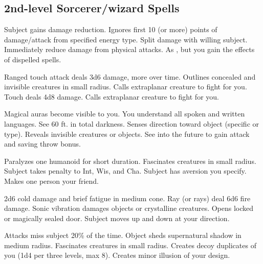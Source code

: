 \subsection{2nd-level Sorcerer/wizard Spells} 
\begin{swspelllist}
   Subject gains damage reduction.
   Ignores first 10 (or more) points of damage/attack from specified energy type.
   Split damage with willing subject.
   Immediately reduce damage from physical attacks.
   As , but you gain the effects of dispelled spells.

   Ranged touch attack deals 3d6 damage, more over time.
   Outlines concealed and invisible creatures in small radius.
   Calls extraplanar creature to fight for you.
   Touch deals 4d8 damage.
   Calls extraplanar creature to fight for you.

   Magical auras become visible to you.
   You understand all spoken and written languages.
   See 60 ft. in total darkness.
   Senses direction toward object (specific or type).
   Reveals invisible creatures or objects.
  \spellheadrestricted{}
   See into the future to gain attack and saving throw bonus.

   Paralyzes one humanoid for short duration.
   Fascinates creatures in small radius.
   Subject takes  penalty to Int, Wis, and Cha.
   Subject has aversion you specify.
   Makes one person your friend.

   2d6 cold damage and brief fatigue in medium cone.
   Ray (or rays) deal 6d6 fire damage.
   Sonic vibration damages objects or crystalline creatures.
   Opens locked or magically sealed door.
   Subject moves up and down at your direction.

   Attacks miss subject 20\% of the time.
   Object sheds supernatural shadow in medium radius.
   Fascinates creatures in small radius.
   Creates decoy duplicates of you (1d4  per three levels, max 8).
   Creates minor illusion of your design.


\end{swspelllist}
